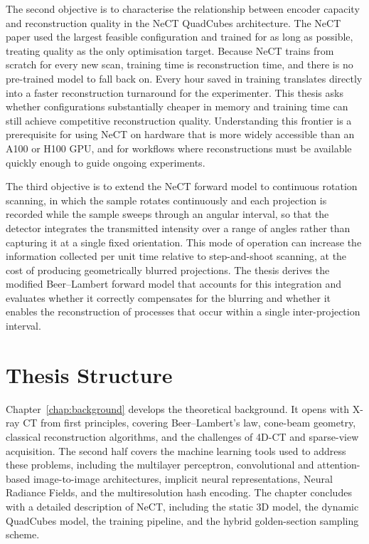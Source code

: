 \documentclass[12pt, a4paper, twoside]{report}
\begin{document}
The second objective is to characterise the relationship between encoder capacity and reconstruction quality in the NeCT QuadCubes architecture. The NeCT paper used the largest feasible configuration and trained for as long as possible, treating quality as the only optimisation target. Because NeCT trains from scratch for every new scan, training time is reconstruction time, and there is no pre-trained model to fall back on. Every hour saved in training translates directly into a faster reconstruction turnaround for the experimenter. This thesis asks whether configurations substantially cheaper in memory and training time can still achieve competitive reconstruction quality. Understanding this frontier is a prerequisite for using NeCT on hardware that is more widely accessible than an A100 or H100 GPU, and for workflows where reconstructions must be available quickly enough to guide ongoing experiments.

The third objective is to extend the NeCT forward model to continuous rotation scanning, in which the sample rotates continuously and each projection is recorded while the sample sweeps through an angular interval, so that the detector integrates the transmitted intensity over a range of angles rather than capturing it at a single fixed orientation. This mode of operation can increase the information collected per unit time relative to step-and-shoot scanning, at the cost of producing geometrically blurred projections. The thesis derives the modified Beer--Lambert forward model that accounts for this integration and evaluates whether it correctly compensates for the blurring and whether it enables the reconstruction of processes that occur within a single inter-projection interval.

\section{Thesis Structure}
\label{sec:intro_structure}

Chapter~\ref{chap:background} develops the theoretical background. It opens with X-ray CT from first principles, covering Beer--Lambert's law, cone-beam geometry, classical reconstruction algorithms, and the challenges of 4D-CT and sparse-view acquisition. The second half covers the machine learning tools used to address these problems, including the multilayer perceptron, convolutional and attention-based image-to-image architectures, implicit neural representations, Neural Radiance Fields, and the multiresolution hash encoding. The chapter concludes with a detailed description of NeCT, including the static 3D model, the dynamic QuadCubes model, the training pipeline, and the hybrid golden-section sampling scheme.
\end{document}

